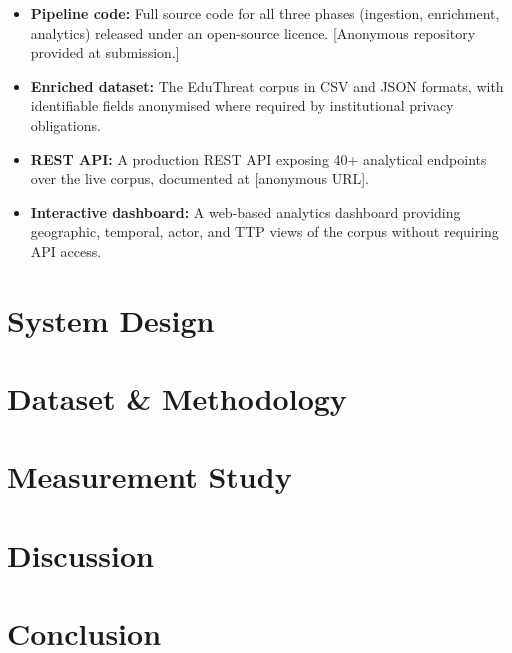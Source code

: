 \documentclass[sigconf,anonymous]{acmart}
\begin{document}
\begin{itemize}[leftmargin=*,nosep]
  \item \textbf{Pipeline code:} Full source code for all three phases (ingestion, enrichment, analytics) released under an open-source licence. [Anonymous repository provided at submission.]

  \item \textbf{Enriched dataset:} The EduThreat corpus in CSV and JSON formats, with identifiable fields anonymised where required by institutional privacy obligations.

  \item \textbf{REST API:} A production REST API exposing 40+ analytical endpoints over the live corpus, documented at [anonymous URL].

  \item \textbf{Interactive dashboard:} A web-based analytics dashboard providing geographic, temporal, actor, and TTP views of the corpus without requiring API access.
\end{itemize}

\section{System Design}\label{sec:system}

\section{Dataset \& Methodology}\label{sec:dataset}

\section{Measurement Study}\label{sec:measurement}

\section{Discussion}\label{sec:discussion}

\section{Conclusion}\label{sec:conclusion}




\end{document}
